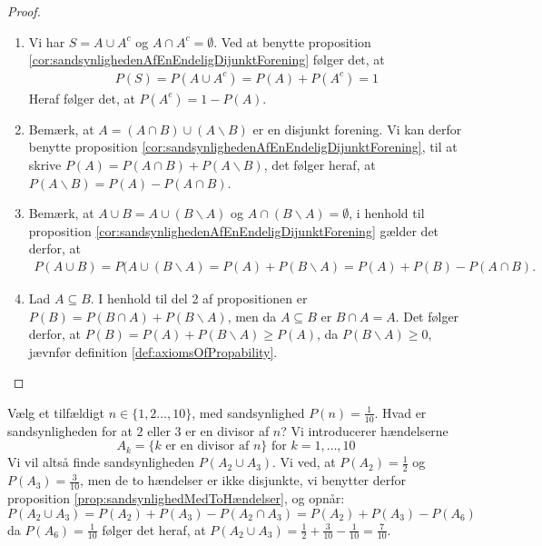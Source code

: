 \begin{proof}
\ %
\begin{enumerate}
    \item Vi har $S=A \cup A^c$ og $A \cap A^c=\emptyset$. Ved at benytte proposition \ref{cor:sandsynlighedenAfEnEndeligDijunktForening} følger det, at 
\begin{align*}
    P(S)=P(A \cup A^c) = P(A) + P(A^c) = 1
\end{align*}
Heraf følger det, at $P(A^c) = 1 - P(A)$.
    
    \item Bemærk, at $A = (A \cap B) \cup (A \backslash B)$ er en disjunkt forening. Vi kan derfor benytte proposition \ref{cor:sandsynlighedenAfEnEndeligDijunktForening}, til at skrive
    $P(A) = P(A \cap B) + P(A \backslash B)$, det følger heraf, at $P(A \backslash B) = P(A) - P(A \cap B)$.
    
    \item Bemærk, at $A\cup B=A\cup (B\backslash A)$ og $A\cap (B \backslash A)=\emptyset$, i henhold til proposition \ref{cor:sandsynlighedenAfEnEndeligDijunktForening} gælder det derfor, at
    \begin{align*}
        P(A\cup B) = P(A \cup (B \backslash A) = P(A)+P(B\backslash A)=P(A)+P(B)-P(A\cap B).
    \end{align*}
    
    \item Lad $A \subseteq B$. I henhold til del 2 af propositionen er $P(B) = P(B \cap A) + P(B \backslash A)$, men da $A \subseteq B$ er $B \cap A = A$. Det følger derfor, at $P(B) = P(A) + P(B \backslash A) \geq P(A)$, da $P(B \backslash A) \geq 0$, jævnfør definition \ref{def:axiomsOfPropability}.
\end{enumerate}
\end{proof}


 
\begin{exmp} %
Vælg et tilfældigt $n \in \{1, 2 \ldots, 10\}$, med sandsynlighed $P(n)=\frac{1}{10}$. Hvad er sandsynligheden for at $2$ eller $3$ er en divisor af $n$?
Vi introducerer hændelserne
\begin{equation*}
    A_k = \{k \text{ er en divisor af } n\} \text{ for } k = 1, \ldots, 10  
\end{equation*}
Vi vil altså finde sandsynligheden $P(A_2 \cup A_3)$. Vi ved, at $P(A_2) = \frac{1}{2}$ og $P(A_3) = \frac{3}{10}$, men de to hændelser er ikke disjunkte, vi benytter derfor proposition \ref{prop:sandsynlighedMedToHændelser}, og opnår:
\begin{equation*}
    P(A_2 \cup A_3) = P(A_2) + P(A_3) - P(A_2 \cap A_3) = P(A_2) + P(A_3) - P(A_6)
\end{equation*}
da $P(A_6) = \frac{1}{10}$ følger det heraf, at $P(A_2 \cup A_3) = \frac{1}{2} + \frac{3}{10} - \frac{1}{10} = \frac{7}{10}$.
\end{exmp}


